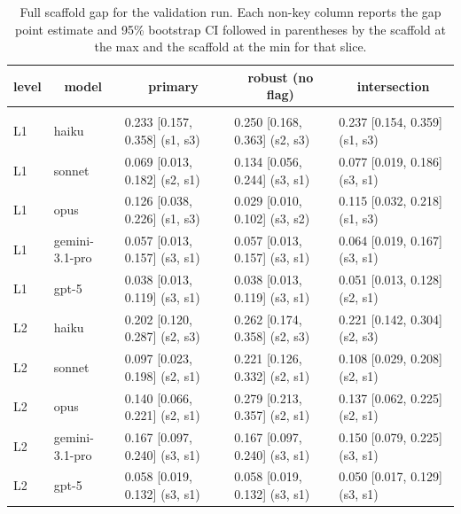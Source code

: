 \documentclass[10pt]{article} %
\begin{document}
    \begin{table}[t]
        \caption{Full scaffold gap for the validation run. Each non-key column reports the gap point estimate and 95\% bootstrap CI followed in parentheses by the scaffold at the max and the scaffold at the min for that slice.}
    \label{tab:scaffold_gap_full}
    \begin{center}
    \small
    \begin{tabular}{lllll}
        \multicolumn{1}{c}{\bf level} & \multicolumn{1}{c}{\bf model} & \multicolumn{1}{c}{\bf primary} & \multicolumn{1}{c}{\bf robust (no flag)} & \multicolumn{1}{c}{\bf intersection} \\
        \hline \\
        L1 & haiku & 0.233 [0.157, 0.358] (s1, s3) & 0.250 [0.168, 0.363] (s2, s3) & 0.237 [0.154, 0.359] (s1, s3) \\
        L1 & sonnet & 0.069 [0.013, 0.182] (s2, s1) & 0.134 [0.056, 0.244] (s3, s1) & 0.077 [0.019, 0.186] (s3, s1) \\
        L1 & opus & 0.126 [0.038, 0.226] (s1, s3) & 0.029 [0.010, 0.102] (s3, s2) & 0.115 [0.032, 0.218] (s1, s3) \\
        L1 & gemini-3.1-pro & 0.057 [0.013, 0.157] (s3, s1) & 0.057 [0.013, 0.157] (s3, s1) & 0.064 [0.019, 0.167] (s3, s1) \\
        L1 & gpt-5 & 0.038 [0.013, 0.119] (s3, s1) & 0.038 [0.013, 0.119] (s3, s1) & 0.051 [0.013, 0.128] (s2, s1) \\
        L2 & haiku & 0.202 [0.120, 0.287] (s2, s3) & 0.262 [0.174, 0.358] (s2, s3) & 0.221 [0.142, 0.304] (s2, s3) \\
        L2 & sonnet & 0.097 [0.023, 0.198] (s2, s1) & 0.221 [0.126, 0.332] (s2, s1) & 0.108 [0.029, 0.208] (s2, s1) \\
        L2 & opus & 0.140 [0.066, 0.221] (s2, s1) & 0.279 [0.213, 0.357] (s2, s1) & 0.137 [0.062, 0.225] (s2, s1) \\
        L2 & gemini-3.1-pro & 0.167 [0.097, 0.240] (s3, s1) & 0.167 [0.097, 0.240] (s3, s1) & 0.150 [0.079, 0.225] (s3, s1) \\
        L2 & gpt-5 & 0.058 [0.019, 0.132] (s3, s1) & 0.058 [0.019, 0.132] (s3, s1) & 0.050 [0.017, 0.129] (s3, s1) \\
    \end{tabular}
    \end{center}
    \end{table}

\FloatBarrier
\end{document}
